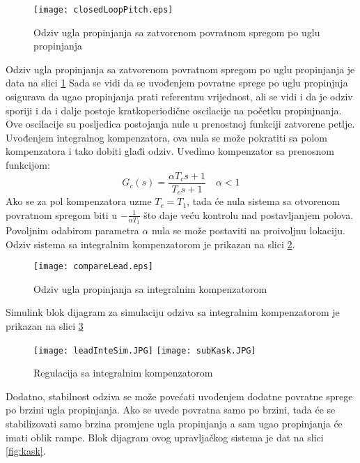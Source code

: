 \begin{figure}[!ht]
    \centering 
    \texttt{[image: closedLoopPitch.eps]}
    \caption{Odziv ugla propinjanja sa zatvorenom povratnom spregom po uglu propinjanja}
    \label{fig:closedPitch}
\end{figure}
Odziv ugla propinjanja sa zatvorenom povratnom spregom po uglu propinjanja je data na slici \ref{fig:closedPitch}
Sada se vidi da se uvođenjem povratne sprege po uglu propinjnja osigurava da ugao propinjanja prati referentnu 
vrijednost, ali se vidi i da je odziv sporiji  i da i dalje postoje kratkoperiodične oscilacije na početku propinjnanja.
Ove oscilacije su posljedica postojanja nule u prenostnoj funkciji zatvorene petlje. 
Uvođenjem integralnog kompenzatora, ova nula se može pokratiti sa polom kompenzatora i tako dobiti glađi odziv.
Uvedimo kompenzator sa prenosnom funkcijom:
\begin{equation}
    G_c(s) = \frac{\alpha T_cs+1}{T_cs+1}  \quad \alpha<1
\end{equation}
Ako se za pol kompenzatora uzme $T_c = T_1$, tada će nula sistema sa otvorenom 
povratnom spregom biti u $-\frac{1}{\alpha T_1}$ što daje veću kontrolu nad postavljanjem 
polova. Povoljnim odabirom parametra $\alpha$ nula se može postaviti na proivoljnu lokaciju.
Odziv sistema sa integralnim kompenzatorom je prikazan na slici \ref{fig:komp}.
\begin{figure}[!ht]
    \centering
    \texttt{[image: compareLead.eps]}
    \caption{Odziv ugla propinjanja sa integralnim kompenzatorom}
    \label{fig:komp}
\end{figure}
Simulink blok dijagram za simulaciju odziva sa integralnim kompenzatorom je prikazan na 
slici \ref{fig:leadSim}
\begin{figure}[!ht]
    \centering
    \texttt{[image: leadInteSim.JPG]}
    \texttt{[image: subKask.JPG]}
    \caption{Regulacija sa integralnim kompenzatorom}
    \label{fig:leadSim}
\end{figure}
Dodatno, stabilnost odziva se može povećati uvođenjem dodatne povratne sprege po brzini 
ugla propinjanja. Ako se uvede povratna samo po brzini, tada će se stabilizovati samo 
brzina promjene ugla propinjanja a sam ugao propinjanja će imati oblik rampe. 
Blok dijagram ovog upravljačkog sistema je dat na slici \ref{fig:kask}.
